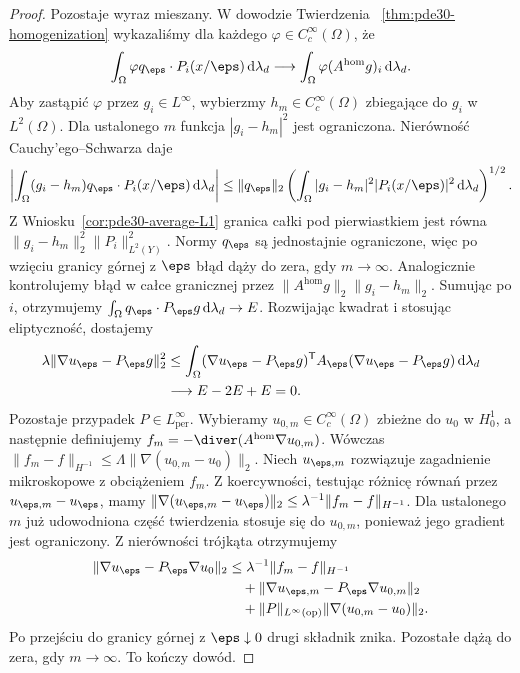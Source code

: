 \begin{proof}
Pozostaje wyraz mieszany. W dowodzie Twierdzenia
~\ref{thm:pde30-homogenization} wykazaliśmy
dla każdego $\varphi\in C_c^\infty(\Omega)$, że
\[
 \int_\Omega\varphi q_\eps\cdot P_i(x/\eps)\,
 \mathrm d\lambda_d
 \longrightarrow
 \int_\Omega\varphi(A^{\mathrm{hom}}g)_i\,
 \mathrm d\lambda_d .
\]
Aby zastąpić $\varphi$ przez $g_i\in L^\infty$,
wybierzmy $h_m\in C_c^\infty(\Omega)$
zbiegające do $g_i$ w $L^2(\Omega)$.
Dla ustalonego $m$ funkcja $|g_i-h_m|^2$
jest ograniczona. Nierówność Cauchy'ego--Schwarza
daje
\[
 \left|\int_\Omega(g_i-h_m)q_\eps\cdot
 P_i(x/\eps)\,\mathrm d\lambda_d\right|
 \le\|q_\eps\|_2
 \left(\int_\Omega |g_i-h_m|^2|P_i(x/\eps)|^2
 \,\mathrm d\lambda_d\right)^{1/2}.
\]
Z Wniosku~\ref{cor:pde30-average-L1} granica
całki pod pierwiastkiem jest równa
$\|g_i-h_m\|_2^2\|P_i\|_{L^2(Y)}^2$.
Normy $q_\eps$ są jednostajnie ograniczone,
więc po wzięciu granicy górnej z $\eps$
błąd dąży do zera, gdy $m\to\infty$.
Analogicznie kontrolujemy błąd w całce granicznej
przez $\|A^{\mathrm{hom}}g\|_2\|g_i-h_m\|_2$.
Sumując po $i$, otrzymujemy
$\int_\Omega q_\eps\cdot P_\eps g\,\mathrm d\lambda_d\to E$.
Rozwijając kwadrat i stosując eliptyczność,
dostajemy
\[
 \begin{aligned}
 \lambda\|\nabla u_\eps-P_\eps g\|_2^2
 &\le\int_\Omega(\nabla u_\eps-P_\eps g)^{\mathsf T}
 A_\eps(\nabla u_\eps-P_\eps g)\,\mathrm d\lambda_d\\
 &\longrightarrow E-2E+E=0.
 \end{aligned}
\]
Pozostaje przypadek $P\in L^\infty_{\mathrm{per}}$.
Wybieramy $u_{0,m}\in C_c^\infty(\Omega)$ zbieżne
do $u_0$ w $H_0^1$, a następnie definiujemy
$f_m=-\diver(A^{\mathrm{hom}}\nabla u_{0,m})$.
Wówczas
$\|f_m-f\|_{H^{-1}}\le\Lambda\|\nabla(u_{0,m}-u_0)\|_2$.
Niech $u_{\eps,m}$ rozwiązuje zagadnienie
mikroskopowe z obciążeniem $f_m$.
Z koercywności, testując różnicę równań przez
$u_{\eps,m}-u_\eps$, mamy
$\|\nabla(u_{\eps,m}-u_\eps)\|_2
\le\lambda^{-1}\|f_m-f\|_{H^{-1}}$.
Dla ustalonego $m$ już udowodniona część
twierdzenia stosuje się do $u_{0,m}$, ponieważ
jego gradient jest ograniczony. Z nierówności
trójkąta otrzymujemy
\[
 \begin{aligned}
 \|\nabla u_\eps-P_\eps\nabla u_0\|_2
 &\le \lambda^{-1}\|f_m-f\|_{H^{-1}}\\
 &\quad+\|\nabla u_{\eps,m}-P_\eps\nabla u_{0,m}\|_2\\
 &\quad+\|P\|_{L^\infty(\mathrm{op})}
       \|\nabla(u_{0,m}-u_0)\|_2.
 \end{aligned}
\]
Po przejściu do granicy górnej z $\eps\downarrow0$
drugi składnik znika. Pozostałe dążą do zera,
gdy $m\to\infty$. To kończy dowód.
\end{proof}

